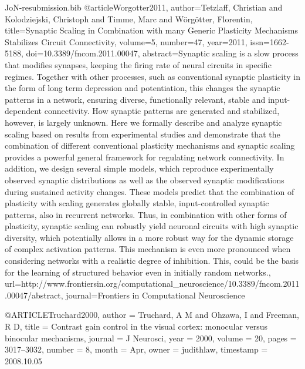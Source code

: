 \documentclass{article}
\begin{document}
\begin{filecontents}{JoN-resubmission.bib}
@article{Worgotter2011,
author={Tetzlaff, Christian  and  Kolodziejski, Christoph  and  Timme, Marc  and  W{\"o}rg{\"o}tter, Florentin},
title={Synaptic Scaling in Combination with many Generic Plasticity Mechanisms Stabilizes Circuit Connectivity},
volume={5},
number={47},
year={2011},
issn={1662-5188},
doi={10.3389/fncom.2011.00047},
abstract={Synaptic scaling is a slow process that modifies synapses, keeping the firing rate of neural circuits in specific regimes. Together with other processes, such as conventional synaptic plasticity in the form of long term depression and potentiation, this changes the synaptic patterns in a network, ensuring diverse, functionally relevant, stable and input-dependent connectivity. How synaptic patterns are generated and stabilized, however, is largely unknown. Here we formally describe and analyze synaptic scaling based on results from experimental studies and demonstrate that the combination of different conventional plasticity mechanisms and synaptic scaling provides a powerful general framework for regulating network connectivity. In addition, we design several simple models, which reproduce experimentally observed synaptic distributions as well as the observed synaptic modifications during sustained activity changes. These models predict that the combination of plasticity with scaling generates globally stable, input-controlled synaptic patterns, also in recurrent networks. Thus, in combination with other forms of plasticity, synaptic scaling can robustly yield neuronal circuits with high synaptic diversity, which potentially allows in a more robust way for the dynamic storage of complex activation patterns. This mechanism is even more pronounced when considering networks with a realistic degree of inhibition. This, could be the basis for the learning of structured behavior even in initially random networks.},
url={http://www.frontiersin.org/computational_neuroscience/10.3389/fncom.2011.00047/abstract},
journal={Frontiers in Computational Neuroscience}
}

@ARTICLE{Truchard2000,
  author = {Truchard, A M and Ohzawa, I and Freeman, R D},
  title = {{{C}ontrast gain control in the visual cortex: monocular versus binocular
	mechanisms}},
  journal = {J Neurosci},
  year = {2000},
  volume = {20},
  pages = {3017--3032},
  number = {8},
  month = {Apr},
  owner = {judithlaw},
  timestamp = {2008.10.05}
}


\end{filecontents}
\end{document}

